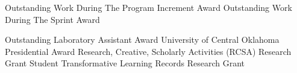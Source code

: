 %
%
%
\vspace*{-.15cm}
\textbf{}
\begin{scholarship}
		{Outstanding Work During The Program Increment \hfill Award  }
	    {Outstanding Work During The Sprint \hfill Award  }
\end{scholarship}
\vspace*{-.15cm}
\textbf{}
\begin{scholarship}
					{{Outstanding Laboratory Assistant} \hfill Award}
					{{University of Central Oklahoma Presidential} \hfill Award}
					{{Research, Creative, Scholarly Activities (RCSA)} \hfill Research Grant}
					{{Student Transformative Learning Records} \hfill Research Grant}
\end{scholarship}